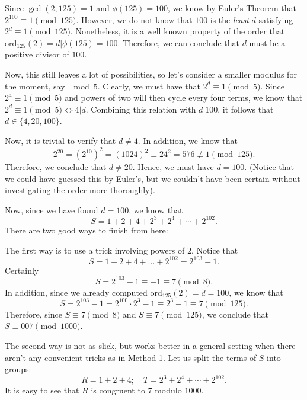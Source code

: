 \begin{enumerate}
 Since $\gcd(2, 125) = 1$ and $\phi(125) = 100$, we know by Euler's Theorem that $2^{100} \equiv 1 \pmod {125}.$ However, we do not know that $100$ is the \textit{least} $d$ satisfying $2^d \equiv 1 \pmod {125}.$ Nonetheless, it is a well known property of the order that $\text{ord}_{125}(2) = d | \phi(125) = 100.$ Therefore, we can conclude that $d$ must be a positive divisor of $100.$

 Now, this still leaves a lot of possibilities, so let's consider a smaller modulus for the moment, say $\mod 5.$ Clearly, we must have that $2^d \equiv 1 \pmod 5.$ Since $2^4 \equiv 1 \pmod 5$ and powers of two will then cycle every four terms, we know that $2^d \equiv 1 \pmod 5 \iff 4 | d.$ Combining this relation with $d | 100$, it follows that $d \in \{4, 20, 100\}.$ 

 Now, it is trivial to verify that $d \ne 4.$ In addition, we know that 
 \[2^{20} = \left(2^{10}\right)^2 = \left(1024\right)^2 \equiv 24^2 = 576 \not\equiv 1 \pmod {125}.\] Therefore, we conclude that $d \ne 20.$ Hence, we must have $d = 100.$ (Notice that we could have guessed this by Euler's, but we couldn't have been certain without investigating the order more thoroughly).

 Now, since we have found $d = 100$, we know that 
 \[S = 1 + 2 + 4 + 2^3 + 2^4 + \cdots + 2^{102}.\] There are two good ways to finish from here: 

 The first way is to use a trick involving powers of $2.$ Notice that 
 \[S = 1 + 2 + 4 + ... + 2^{102} = 2^{103} - 1.\] Certainly 
 \[S = 2^{103} - 1 \equiv -1 \equiv 7 \pmod {8}.\] In addition, since we already computed $\text{ord}_{125}(2) = d = 100$, we know that 
 \[S = 2^{103} - 1 = 2^{100} \cdot 2^3 - 1 \equiv 2^3 - 1 \equiv 7 \pmod {125}.\] Therefore, since $S \equiv 7 \pmod{8}$ and $S \equiv 7 \pmod{125}$, we conclude that $S \equiv \boxed{007} \pmod {1000}.$

 The second way is not as slick, but works better in a general setting when there aren't any convenient tricks as in Method 1. Let us split the terms of $S$ into groups: 
 \[R = 1 + 2 + 4; \quad T = 2^3 + 2^4 + \cdots + 2^{102}.\] It is easy to see that $R$ is congruent to $7$ modulo $1000.$ 


\end{enumerate}
